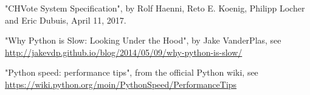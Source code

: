 \begin{thebibliography}{999}
	"CHVote System Specification", by Rolf Haenni, Reto E. Koenig, Philipp Locher and Eric Dubuis, April 11, 2017.

	"Why Python is Slow: Looking Under the Hood", by Jake VanderPlas, see \url{http://jakevdp.github.io/blog/2014/05/09/why-python-is-slow/}

	"Python speed: performance tips", from the official Python wiki, see \url{https://wiki.python.org/moin/PythonSpeed/PerformanceTips}
\end{thebibliography}
